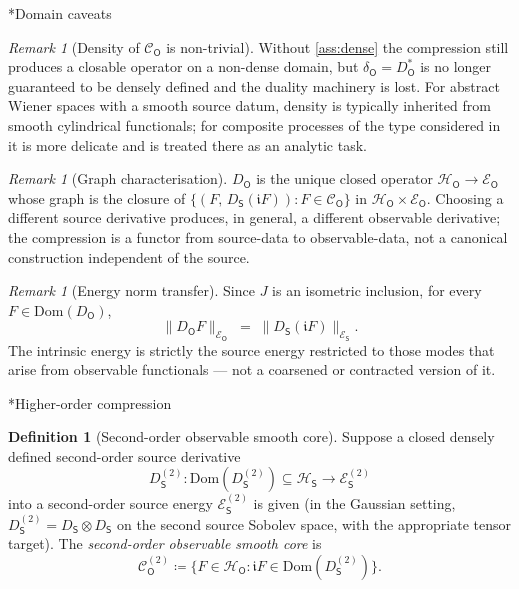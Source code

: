\documentclass[11pt,reqno]{amsart}
\makeatletter
\renewcommand\subsection{\@startsection{subsection}{2}%
  \z@{.7\linespacing}{.5\linespacing}%
  {\normalfont\centering\scshape}}
\theoremstyle{plain}
\theoremstyle{definition}
\newtheorem{definition}[theorem]{Definition}
\theoremstyle{remark}
\newtheorem{remark}[theorem]{Remark}
\newcommand{\Hilb}{\mathcal{H}}
\newcommand{\Dom}{\mathrm{Dom}}
\newcommand{\Energy}{\mathcal{E}}
\newcommand{\Source}{\mathsf{S}}
\newcommand{\Obs}{\mathsf{O}}
\renewcommand{\iota}{\mathfrak{i}}
\makeatother
\begin{document}
\subsection*{Domain caveats}

\begin{remark}[Density of $\mathcal C_\Obs$ is non-trivial]
\label{rem:density-caveat}
Without \cref{ass:dense} the compression still produces a closable
operator on a non-dense domain, but $\delta_\Obs=D_\Obs^{*}$ is no longer
guaranteed to be densely defined and the duality machinery is lost. For
abstract Wiener spaces with a smooth source datum, density is typically
inherited from smooth cylindrical functionals; for composite processes
of the type considered in~\cite{IBMPaper} it is more delicate and is
treated there as an analytic task.
\end{remark}

\begin{remark}[Graph characterisation]\label{rem:minimality}
$D_\Obs$ is the unique closed operator
$\Hilb_\Obs\to\Energy_\Obs$ whose graph is the closure of
$\{(F,\,D_\Source(\iota F)):F\in\mathcal C_\Obs\}$ in
$\Hilb_\Obs\times\Energy_\Obs$. Choosing a different source
derivative produces, in general, a different observable derivative;
the compression is a functor from source-data to observable-data, not
a canonical construction independent of the source.
\end{remark}

\begin{remark}[Energy norm transfer]\label{rem:energy-norm}
Since $J$ is an isometric inclusion, for every $F\in\Dom(D_\Obs)$,
\[
  \|D_\Obs F\|_{\Energy_\Obs}
  \;=\; \|D_\Source(\iota F)\|_{\Energy_\Source}.
\]
The intrinsic energy is strictly the source energy restricted to those
modes that arise from observable functionals --- not a coarsened or
contracted version of it.
\end{remark}

\subsection*{Higher-order compression}

\begin{definition}[Second-order observable smooth core]
\label{def:obs-core-2}
Suppose a closed densely defined second-order source derivative
\[
  D_\Source^{(2)}\colon\Dom(D_\Source^{(2)})\subseteq\Hilb_\Source
   \longrightarrow\Energy_\Source^{(2)}
\]
into a second-order source energy $\Energy_\Source^{(2)}$ is given (in
the Gaussian setting, $D_\Source^{(2)}=D_\Source\otimes D_\Source$ on
the second source Sobolev space, with the appropriate tensor target).
The \emph{second-order observable smooth core} is
\[
  \mathcal C_\Obs^{(2)}\coloneqq
   \bigl\{F\in\Hilb_\Obs:\iota F\in\Dom(D_\Source^{(2)})\bigr\}.
\]
\end{definition}
\end{document}
